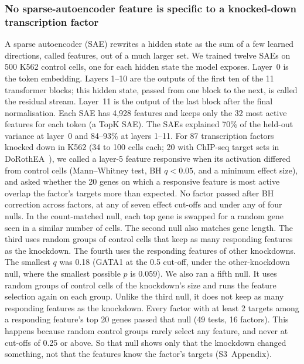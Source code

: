 \documentclass[10pt,letterpaper]{article}
\begin{document}
\subsubsection*{No sparse-autoencoder feature is specific to a knocked-down transcription factor}
A sparse autoencoder (SAE) rewrites a hidden state as the sum of a few
learned directions, called features, out of a much larger set. We
trained twelve SAEs on 500 K562 control cells, one for each hidden state
the model exposes. Layer~0 is the token embedding. Layers 1--10 are the
outputs of the first ten of the 11 transformer blocks; this hidden state,
passed from one block to the next, is called the residual stream.
Layer~11 is the output of the last block after the final normalisation.
Each SAE has 4,928 features and keeps only the 32 most active features
for each token (a TopK SAE). The SAEs explained 70\% of the held-out
variance at layer~0 and 84--93\% at layers 1--11. For 87 transcription
factors knocked down in K562 (34 to 100 cells each; 20 with ChIP-seq
target sets in DoRothEA~\cite{garcia-alonso2019dorothea}), we called a
layer-5 feature responsive when its activation differed from control
cells (Mann--Whitney test, BH $q < 0.05$, and a minimum effect size),
and asked whether the 20 genes on which a responsive feature is most
active overlap the factor's targets more than expected. No factor passed
after BH correction across factors, at any of seven effect cut-offs and
under any of four nulls. In the count-matched null, each top gene is
swapped for a random gene seen in a similar number of cells. The second
null also matches gene length. The third uses random groups of control
cells that keep as many responding features as the knockdown. The fourth
uses the responding features of other knockdowns. The smallest $q$ was
0.18 (GATA1 at the 0.5 cut-off, under the other-knockdown null, where
the smallest possible $p$ is 0.059). We also ran a fifth null. It uses
random groups of control cells of the knockdown's size and runs the
feature selection again on each group. Unlike the third null, it does
not keep as many responding features as the knockdown. Every factor
with at least 2 targets among a responding feature's top 20 genes passed
that null (49 tests, 16 factors). This happens because random control
groups rarely select any feature, and never at cut-offs of 0.25 or
above. So that null shows only that the knockdown changed something, not
that the features know the factor's targets (S3~Appendix).
\end{document}
